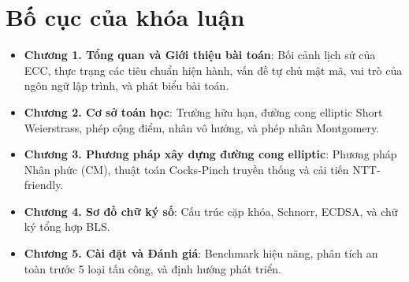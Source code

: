 \section{Bố cục của khóa
luận}\label{bux1ed1-cux1ee5c-cux1ee7a-khuxf3a-luux1eadn}

\begin{itemize}
\tightlist
\item
  \textbf{Chương 1. Tổng quan và Giới thiệu bài toán}: Bối cảnh lịch sử
  của ECC, thực trạng các tiêu chuẩn hiện hành, vấn đề tự chủ mật mã,
  vai trò của ngôn ngữ lập trình, và phát biểu bài toán.
\item
  \textbf{Chương 2. Cơ sở toán học}: Trường hữu hạn, đường cong elliptic
  Short Weierstrass, phép cộng điểm, nhân vô hướng, và phép nhân
  Montgomery.
\item
  \textbf{Chương 3. Phương pháp xây dựng đường cong elliptic}: Phương
  pháp Nhân phức (CM), thuật toán Cocks-Pinch truyền thống và cải tiến
  NTT-friendly.
\item
  \textbf{Chương 4. Sơ đồ chữ ký số}: Cấu trúc cặp khóa, Schnorr, ECDSA,
  và chữ ký tổng hợp BLS.
\item
  \textbf{Chương 5. Cài đặt và Đánh giá}: Benchmark hiệu năng, phân tích
  an toàn trước 5 loại tấn công, và định hướng phát triển.
\end{itemize}

\FloatBarrier
